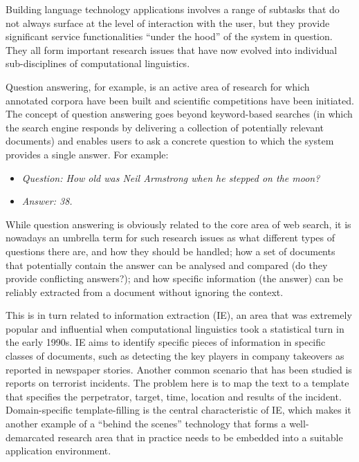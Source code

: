\documentclass{../../metanetpaper}
\begin{document}
\begin{Parallel}[c]{79mm}{78mm}
{Building language technology applications involves a range of subtasks that do
not always surface at the level of interaction with the user, but they provide
significant service functionalities “under the hood” of the system in question.
They all form important research issues that have now evolved into individual
sub-disciplines of computational linguistics.

Question answering, for example, is an active area of research for which
annotated corpora have been built and scientific competitions have been
initiated. The concept of question answering goes beyond keyword-based searches
(in which the search engine responds by delivering a collection of potentially
relevant documents) and enables users to ask a concrete question to which the
system provides a single answer. For example:
\begin{itemize}
\item[] \textit{Question: How old was Neil Armstrong when he stepped on the
              moon?}

\item[] \textit{Answer: 38.}
\end{itemize}
While question answering is obviously related to the core area of web search,
it is nowadays an umbrella term for such research issues as what different
types of questions there are, and how they should be handled; how a set of
documents that potentially contain the answer can be analysed and compared (do
they provide conflicting answers?); and how specific information (the answer)
can be reliably extracted from a document without ignoring the context.

This is in turn related to information extraction (IE), an area that was
extremely popular and influential when computational linguistics took a
statistical turn in the early 1990s. IE aims to identify specific pieces of
information in specific classes of documents, such as detecting the key players
in company takeovers as reported in newspaper stories. Another common scenario
that has been studied is reports on terrorist incidents. The problem here is to
map the text to a template that specifies the perpetrator, target, time,
location and results of the incident. Domain-specific template-filling is the
central characteristic of IE, which makes it another example of a “behind the
scenes” technology that forms a well-demarcated research area that in practice
needs to be embedded into a suitable application environment.


}
\end{Parallel}
\end{document}
